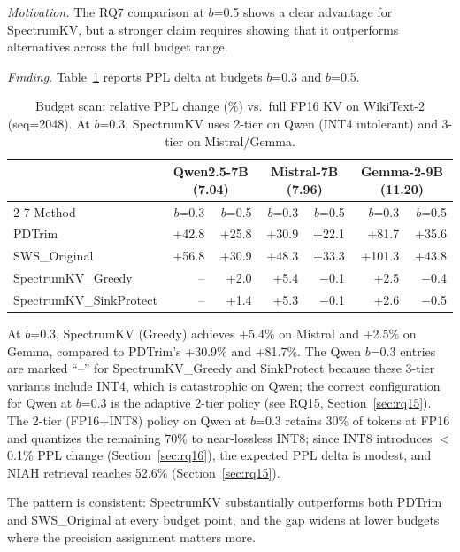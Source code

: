 \documentclass[11pt]{article}
\newcommand{\method}{SpectrumKV}
\newcommand{\pct}{\%}
\theoremstyle{definition}
\theoremstyle{plain}
\begin{document}
\emph{Motivation.}  The RQ7 comparison at $b$=0.5 shows a clear advantage for \method{}, but a stronger claim requires showing that it outperforms alternatives across the full budget range.

\emph{Finding.}  Table~\ref{tab:budget-scan} reports PPL delta at budgets $b$=0.3 and $b$=0.5.

\begin{table}[t]
\centering
\caption{Budget scan: relative PPL change (\%) vs.\ full FP16 KV on WikiText-2 (seq=2048).  At $b$=0.3, SpectrumKV uses 2-tier on Qwen (INT4 intolerant) and 3-tier on Mistral/Gemma.}
\label{tab:budget-scan}
\small
\begin{tabular}{lrr|rr|rr}
\toprule
 & \multicolumn{2}{c|}{Qwen2.5-7B (7.04)} & \multicolumn{2}{c|}{Mistral-7B (7.96)} & \multicolumn{2}{c}{Gemma-2-9B (11.20)} \\
\cmidrule{2-7}
Method & $b$=0.3 & $b$=0.5 & $b$=0.3 & $b$=0.5 & $b$=0.3 & $b$=0.5 \\
\midrule
PDTrim & +42.8 & +25.8 & +30.9 & +22.1 & +81.7 & +35.6 \\
SWS\_Original & +56.8 & +30.9 & +48.3 & +33.3 & +101.3 & +43.8 \\
\midrule
SpectrumKV\_Greedy & -- & +2.0 & +5.4 & $-$0.1 & +2.5 & $-$0.4 \\
SpectrumKV\_SinkProtect & -- & +1.4 & +5.3 & $-$0.1 & +2.6 & $-$0.5 \\
\bottomrule
\end{tabular}
\end{table}

At $b$=0.3, \method{} (Greedy) achieves +5.4\pct{} on Mistral and +2.5\pct{} on Gemma, compared to PDTrim's +30.9\pct{} and +81.7\pct{}.  The Qwen $b$=0.3 entries are marked ``--'' for SpectrumKV\_Greedy and SinkProtect because these 3-tier variants include INT4, which is catastrophic on Qwen; the correct configuration for Qwen at $b$=0.3 is the adaptive 2-tier policy (see RQ15, Section~\ref{sec:rq15}).  The 2-tier (FP16+INT8) policy on Qwen at $b$=0.3 retains 30\pct{} of tokens at FP16 and quantizes the remaining 70\pct{} to near-lossless INT8; since INT8 introduces $<$0.1\pct{} PPL change (Section~\ref{sec:rq16}), the expected PPL delta is modest, and NIAH retrieval reaches 52.6\pct{} (Section~\ref{sec:rq15}).

The pattern is consistent: \method{} substantially outperforms both PDTrim and SWS\_Original at every budget point, and the gap widens at lower budgets where the precision assignment matters more.
\end{document}
